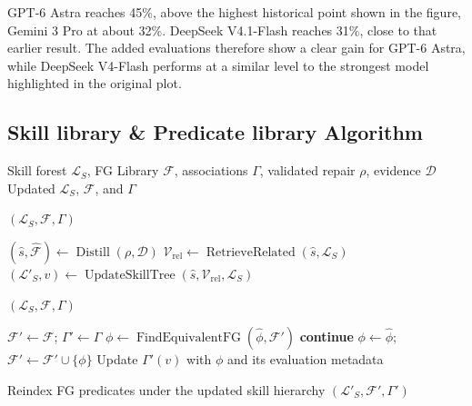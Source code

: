 \documentclass{article} %
\begin{document}
GPT-6 Astra reaches 45\%, above the highest historical point shown in the figure, Gemini 3 Pro at about 32\%. DeepSeek V4.1-Flash reaches 31\%, close to that earlier result. The added evaluations therefore show a clear gain for GPT-6 Astra, while DeepSeek V4-Flash performs at a similar level to the strongest model highlighted in the original plot.
\subsection{Skill library \& Predicate library Algorithm}
\label{Skill library \&Predicate library Algorithm}
\begin{algorithm}[t]
\caption{Coupled Skill and Predicate Library Consolidation}
\label{alg:skill_fg_consolidation}
\begin{algorithmic}[1]
\Require Skill forest $\mathcal{L}_{S}$, FG Library $\mathcal{F}$,
         associations $\Gamma$, validated repair $\rho$, evidence $\mathcal{D}$
\Ensure Updated $\mathcal{L}_{S}$, $\mathcal{F}$, and $\Gamma$

    \State \Return $(\mathcal{L}_{S},\mathcal{F},\Gamma)$
\EndIf

\State $(\hat{s},\widehat{\mathcal{F}})
       \gets\operatorname{Distill}(\rho,\mathcal{D})$
\State $\mathcal{V}_{\mathrm{rel}}
       \gets\operatorname{RetrieveRelated}(\hat{s},\mathcal{L}_{S})$
\State $(\mathcal{L}'_{S},v)
       \gets\operatorname{UpdateSkillTree}
       (\hat{s},\mathcal{V}_{\mathrm{rel}},\mathcal{L}_{S})$

    \State \Return $(\mathcal{L}_{S},\mathcal{F},\Gamma)$
\EndIf

\State $\mathcal{F}'\gets\mathcal{F}$;
       $\Gamma'\gets\Gamma$
    \State $\phi\gets\operatorname{FindEquivalentFG}(\hat{\phi},\mathcal{F}')$
            \State \textbf{continue}
        \EndIf
        \State $\phi\gets\hat{\phi}$;
               $\mathcal{F}'\gets\mathcal{F}'\cup\{\phi\}$
    \EndIf
    \State Update $\Gamma'(v)$ with $\phi$ and its evaluation metadata
\EndFor

\State Reindex FG predicates under the updated skill hierarchy
\State \Return $(\mathcal{L}'_{S},\mathcal{F}',\Gamma')$
\end{algorithmic}
\end{algorithm}
\newpage
\end{document}
